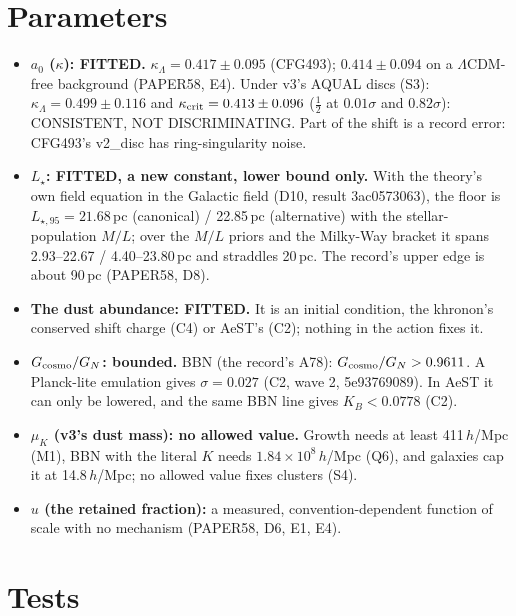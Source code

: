 \documentclass[10pt]{article}
\begin{document}
\section{Parameters}
\begin{itemize}
\item \textbf{$a_0$ ($\kappa$): FITTED.} $\kappa_\Lambda=0.417\pm0.095$ (CFG493); $0.414\pm0.094$ on a $\Lambda$CDM-free background (PAPER58, E4). Under v3's AQUAL discs (S3): $\kappa_\Lambda=0.499\pm0.116$ and $\kappa_{\rm crit}=0.413\pm0.096$ ($\tfrac12$ at $0.01\sigma$ and $0.82\sigma$): CONSISTENT, NOT DISCRIMINATING. Part of the shift is a record error: CFG493's v2\_disc has ring-singularity noise.
\item \textbf{$L_\star$: FITTED, a new constant, lower bound only.} With the theory's own field equation in the Galactic field (D10, result 3ac0573063), the floor is $L_{\star,95}=21.68$\,pc (canonical) / 22.85\,pc (alternative) with the stellar-population $M/L$; over the $M/L$ priors and the Milky-Way bracket it spans 2.93--22.67 / 4.40--23.80\,pc and straddles 20\,pc. The record's upper edge is about 90\,pc (PAPER58, D8).
\item \textbf{The dust abundance: FITTED.} It is an initial condition, the khronon's conserved shift charge (C4) or AeST's (C2); nothing in the action fixes it.
\item \textbf{$G_{\rm cosmo}/G_N$: bounded.} BBN (the record's A78): $G_{\rm cosmo}/G_N>0.9611$. A Planck-lite emulation gives $\sigma=0.027$ (C2, wave 2, 5e93769089). In AeST it can only be lowered, and the same BBN line gives $K_B<0.0778$ (C2).
\item \textbf{$\mu_K$ (v3's dust mass): no allowed value.} Growth needs at least 411\,$h$/Mpc (M1), BBN with the literal $K$ needs $1.84\times10^{8}\,h$/Mpc (Q6), and galaxies cap it at 14.8\,$h$/Mpc; no allowed value fixes clusters (S4).
\item \textbf{$u$ (the retained fraction):} a measured, convention-dependent function of scale with no mechanism (PAPER58, D6, E1, E4).
\end{itemize}

\section{Tests}
\end{document}
